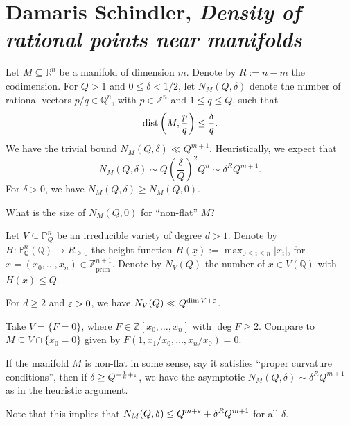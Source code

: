 \documentclass[reqno]{amsart} 
\numberwithin{theorem}{section}
\numberwithin{equation}{section}
\begin{document}
\section{Damaris Schindler, \emph{Density of rational points near manifolds}}

Let $M \subseteq \mathbb{R}^n$ be a manifold of dimension $m$.  Denote by $R := n - m$ the codimension.  For $Q > 1$ and $0 \leq \delta < 1/2$, let $N_M(Q, \delta)$ denote the number of rational vectors $p / q \in \mathbb{Q}^n$, with $p \in \mathbb{Z}^n$ and $1 \leq q \leq Q$, such that
\begin{equation*}
  \operatorname{dist}\left(M, \frac{p}{q}\right) \leq \frac{\delta}{q}.
\end{equation*}
We have the trivial bound $N_M(Q, \delta) \ll Q^{m + 1}$.  Heuristically, we expect that
\begin{equation*}
  N_M(Q, \delta) \sim Q \left( \frac{\delta}{Q} \right)^2 Q^n \sim \delta^R Q^{m + 1}.
\end{equation*}
For $\delta > 0$, we have $N_M(Q, \delta) \geq N_M(Q, 0)$.

What is the size of $N_M(Q, 0)$ for ``non-flat'' $M$?

Let $V \subseteq \mathbb{P}_Q^n$ be an irreducible variety of degree $d > 1$.  Denote by $H : \mathbb{P}_{\mathbb{Q}}^n(\mathbb{Q}) \rightarrow R_{\geq 0}$
the height function $H(\underline{x}) := \max_{0 \leq i \leq n} \lvert x_i \rvert$, for $\underline{x} =(x_0, \dotsc, x_n) \in \mathbb{Z}^{n + 1}_{\mathrm{prim}}$.  Denote by $N_V(Q)$ the number of $x \in V(\mathbb{Q})$ with $H(x) \leq Q$.
\begin{conjecture}
  For $d \geq 2$ and $\varepsilon > 0$, we have $N_V(Q) \ll Q^{\dim V + \varepsilon}$.
\end{conjecture}
\begin{example}
  Take $V = \{F = 0\}$, where $F \in \mathbb{Z}[x_0, \dotsc, x_n]$ with $\deg F \geq 2$.  Compare to $M \subseteq V \cap \{x_0 = 0\}$ given by $F(1, x_1 / x_0, \dotsc, x_n / x_0) = 0$.
\end{example}
\begin{conjecture}
  If the manifold $M$ is non-flat in some sense, say it satisfies ``proper curvature conditions'', then if $\delta \geq Q^{- \frac{1}{k} + \varepsilon}$, we have the asymptotic $N_M(Q, \delta) \sim \delta^R Q^{m + 1}$ as in the heuristic argument.
\end{conjecture}
Note that this implies that $N_M(Q, \delta) \leq Q^{m + \varepsilon} + \delta^R Q^{m + 1}$ for all $\delta$.
\end{document}
